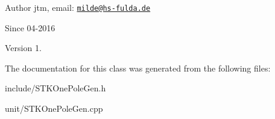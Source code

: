 \begin{DoxyAuthor}{Author}
jtm, email\-:  \href{mailto:milde@hs-fulda.de}{\tt milde@hs-\/fulda.\-de} 
\end{DoxyAuthor}
\begin{DoxySince}{Since}
04-\/2016 
\end{DoxySince}
\begin{DoxyVersion}{Version}
1. 
\end{DoxyVersion}


The documentation for this class was generated from the following files\-:\begin{DoxyCompactItemize}
\item 
include/S\-T\-K\-One\-Pole\-Gen.\-h\item 
unit/S\-T\-K\-One\-Pole\-Gen.\-cpp\end{DoxyCompactItemize}
